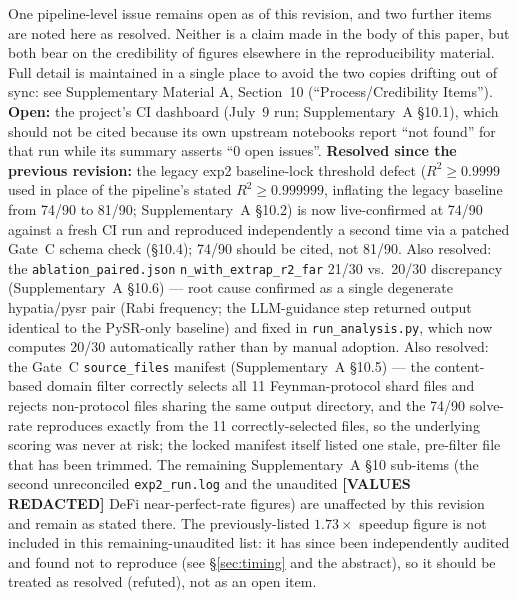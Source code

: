 \documentclass[twoside,11pt]{article}
\begin{document}
One pipeline-level issue remains open as of this revision, and two further
items are noted here as resolved. Neither is a claim made in the body of this
paper, but both bear on the credibility of figures elsewhere in the
reproducibility material. Full detail is maintained in a single place to
avoid the two copies drifting out of sync: see Supplementary Material A,
Section~10 (``Process/Credibility Items''). \textbf{Open:} the project's CI
dashboard (July~9 run; Supplementary~A \S10.1), which should not be cited
because its own upstream notebooks report ``not found'' for that run while
its summary asserts ``0 open issues''. \textbf{Resolved since the previous
revision:} the legacy exp2 baseline-lock threshold defect ($R^2 \geq 0.9999$
used in place of the pipeline's stated $R^2 \geq 0.999999$, inflating the
legacy baseline from 74/90 to 81/90; Supplementary~A \S10.2) is now
live-confirmed at 74/90 against a fresh CI run and reproduced independently
a second time via a patched Gate~C schema check (\S10.4); 74/90 should be
cited, not 81/90. Also resolved: the \texttt{ablation\_paired.json}
\texttt{n\_with\_extrap\_r2\_far} 21/30 vs.\ 20/30 discrepancy
(Supplementary~A \S10.6) --- root cause confirmed as a single degenerate
hypatia/pysr pair (Rabi frequency; the LLM-guidance step returned output
identical to the PySR-only baseline) and fixed in
\texttt{run\_analysis.py}, which now computes 20/30 automatically rather
than by manual adoption. Also resolved: the Gate~C \texttt{source\_files}
manifest (Supplementary~A \S10.5) --- the content-based domain filter
correctly selects all 11 Feynman-protocol shard files and rejects
non-protocol files sharing the same output directory, and the 74/90
solve-rate reproduces exactly from the 11 correctly-selected files, so the
underlying scoring was never at risk; the locked manifest itself listed
one stale, pre-filter file that has been trimmed. The remaining
Supplementary~A \S10 sub-items (the second unreconciled
\texttt{exp2\_run.log} and the unaudited \textbf{[VALUES REDACTED]} DeFi
near-perfect-rate figures) are unaffected by this revision and remain as
stated there. The previously-listed $1.73\times$ speedup figure is not
included in this remaining-unaudited list: it has since been independently
audited and found not to reproduce (see \S\ref{sec:timing} and the
abstract), so it should be treated as resolved (refuted), not as an open
item.
\end{document}

